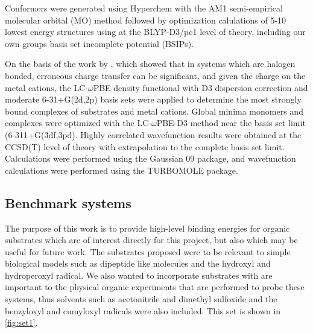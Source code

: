 Conformers were generated using Hyperchem with the AM1 semi-empirical
molecular orbital (MO) method 
followed by optimization calulations of 5-10 lowest energy structures
using at the  BLYP-D3/pc1 level of
theory, including our own groups basis set incomplete potential
(BSIPs).

On the basis of the work by \citet{OterodelaRoza2014}, which showed
that in systems which are halogen bonded, erroneous charge transfer
can be significant, and given the charge on the metal cations, the
LC-$\omega$PBE density functional with D3 dispersion correction and
moderate 6-31+G(2d,2p)  basis sets
were applied to determine the most strongly bound complexes of
substrates and metal cations. Global minima monomers and complexes
were optimized with the LC-$\omega$PBE-D3 method near the basis set
limit (6-311+G(3df,3pd).  Highly correlated wavefunction results were
obtained at the CCSD(T) level of theory with extrapolation to the
complete basis set limit. Calculations were performed
using the Gaussian 09 package\cite{Frisch2009}, and wavefunction
calculations were performed using the TURBOMOLE\cite{turbomole}
package.


\subsection{Benchmark systems}

The purpose of this work is to provide high-level binding energies for organic substrates which are of interest directly for this project, but also which may be useful for future work. The substrates proposed were to be relevant to simple biological models such as dipeptide like molecules and the hydroxyl and hydroperoxyl radical. We also wanted to incorporate substrates with are important to the physical organic experiments that are performed to probe these systems, thus solvents such as acetonitrile and dimethyl sulfoxide and the benzyloxyl and cumyloxyl radicals were also included. This set is shown in \ref{fig:set1}.

